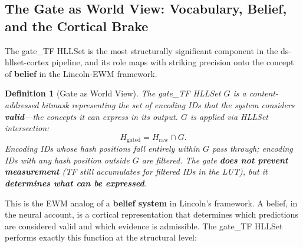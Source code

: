 \documentclass[11pt,a4paper]{article}
\newtheorem{definition}{Definition}[section]
\theoremstyle{remark}
\begin{document}
\subsection{The Gate as World View: Vocabulary, Belief, and the Cortical Brake}
\label{sec:cortex-gate}

The gate\_TF HLLSet is the most structurally significant component in the
ds-hllset-cortex pipeline, and its role maps with striking precision onto the
concept of \textbf{belief} in the Lincoln-EWM framework.

\begin{definition}[Gate as World View]
The gate\_TF HLLSet $G$ is a content-addressed bitmask representing the set of
encoding IDs that the system considers \textbf{valid}---the concepts it can
express in its output. $G$ is applied via HLLSet intersection:
\begin{equation}
  H_{\text{gated}} = H_{\text{raw}} \cap G.
\end{equation}
Encoding IDs whose hash positions fall entirely within $G$ pass through;
encoding IDs with any hash position outside $G$ are filtered. The gate
\textbf{does not prevent measurement} (TF still accumulates for filtered IDs
in the LUT), but it \textbf{determines what can be expressed}.
\end{definition}

This is the EWM analog of a \textbf{belief system} in Lincoln's framework. A
belief, in the neural account, is a cortical representation that determines
which predictions are considered valid and which evidence is admissible. The
gate\_TF HLLSet performs exactly this function at the structural level:
\end{document}
